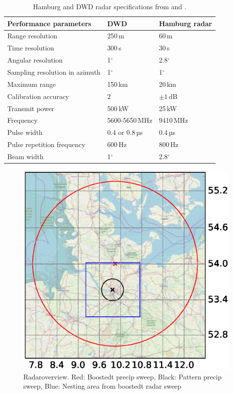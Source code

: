 \documentclass[11pt,twoside,a4paper,fleqn,x11names]{report}
\renewcommand{\deg}{\ensuremath{^{\circ}}}  %
\numberwithin{equation}{chapter}
\numberwithin{figure}{chapter}
\numberwithin{table}{chapter}
\begin{document}
\begin{table}[!htbp]
	\centering
	\caption[]{Hamburg and DWD radar specifications from \citep{Lengfeld2014} and \citep{Frech2013}.}
	\label{tab:radarspec}
	\begin{tabular}{|l|l|l|}
		\hline
		Performance parameters &DWD & Hamburg radar\\\hline
		Range resolution & 250\,m & 60\,m\\
		Time resolution & 300\,s & 30\,s\\
		Angular resolution & 1\deg & 2.8\deg\\
		Sampling resolution in azimuth & 1\deg & 1\deg\\
		Maximum range& 150\,km & 20\,km\\
		Calibration accuracy& $2$ & $\pm1$\,dB\\
		Transmit power & 500\,kW & 25\,kW\\
		Frequency & 5600-5650\,MHz & 9410\,MHz\\
		Pulse width & 0.4 or 0.8\,µs & 0.4\,µs \\
		Pulse repetition frequency & 600\,Hz & 800\,Hz  \\
		Beam width & 1\deg & 2.8\deg \\\hline
	\end{tabular}
\end{table}
\begin{figure}[!htbp]
	\centering
	\includegraphics[width=\textwidth,trim={20mm 0 20mm 0}, clip]{radarOverview.eps}
	\caption{Radaroverview. Red: Boostedt precip sweep, Black: Pattern precip sweep, Blue: Nesting area from boostedt radar sweep}
	\label{fig:radarOverview}
\end{figure}
\end{document}
